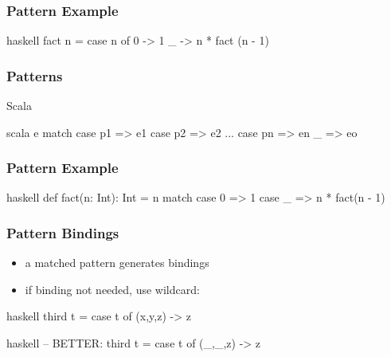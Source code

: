 \documentclass[dvipsnames]{beamer}
\theoremstyle{plain}
\begin{document}
\begin{frame}[fragile]
  \frametitle{Pattern Example}

  \begin{example}[Haskell]
    \begin{pygments}{haskell}
fact n =
    case n of
      0 -> 1
      _ -> n * fact (n - 1)
    \end{pygments}
  \end{example}
\end{frame}

\begin{frame}[fragile]
  \frametitle{Patterns}

  \begin{block}{Scala}
    \begin{pygments}{scala}
e match {
    case p1 => e1
    case p2 => e2
    ...
    case pn => en
    _ => eo
}
    \end{pygments}
  \end{block}
\end{frame}

\begin{frame}[fragile]
  \frametitle{Pattern Example}

  \begin{example}[Scala]
    \begin{pygments}{haskell}
def fact(n: Int): Int =
    n match {
        case 0 => 1
        case _ => n * fact(n - 1)
    }
    \end{pygments}
  \end{example}
\end{frame}

\begin{frame}[fragile]
  \frametitle{Pattern Bindings}

  \begin{itemize}
    \item a matched pattern generates bindings
    \item if binding not needed, use wildcard: 
  \end{itemize}

  \pause
  \begin{example}
    \begin{pygments}{haskell}
third t =
    case t of
      (x,y,z) -> z
    \end{pygments}

    \pause
    \begin{pygments}{haskell}
-- BETTER:
third t =
    case t of
      (_,_,z) -> z
    \end{pygments}
  \end{example}
\end{frame}
\end{document}
